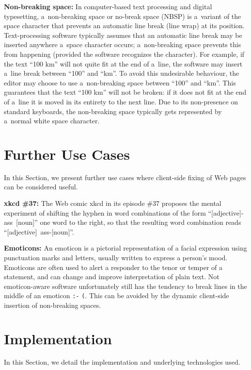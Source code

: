 \documentclass{acm_proc_article-sp}
\begin{document}
\textbf{Non-breaking space:} In computer-based text processing and digital typesetting,
a~non-breaking space or no-break space (NBSP) is a~variant of the space character that prevents an automatic line break (line wrap) at its position.
Text-processing software typically assumes that an automatic line break may be inserted anywhere a~space
character occurs;
a~non-breaking space prevents this from happening (provided the software recognizes the character).
For example, if the text ``100 km'' will not quite fit at the end of a~line,
the software may insert a~line break between ``100'' and ``km''.
To avoid this undesirable behaviour, the editor may choose to use a~non-breaking space between ``100'' and ``km''.
This guarantees that the text ``100 km'' will not be broken:
if it does not fit at the end of a~line
it is moved in its entirety to the next line.
Due to its non-presence on standard keyboards,
the non-breaking space typically gets represented by a~normal white space character.

\section{Further Use Cases}
In this Section, we present further use cases where client-side fixing of Web pages can be considered useful.

\textbf{xkcd \#37:} The Web comic xkcd in its episode \#37 proposes the mental experiment of shifting the hyphen in word combinations of the form \mbox{``[adjective]-ass [noun]''} one word to the right,
so that the resulting word combination reads \mbox{``[adjective] ass-[noun]''}.

\textbf{Emoticons:} An emoticon is a pictorial representation of a facial expression using punctuation marks and letters,
usually written to express a person's mood.
Emoticons are often used to alert a responder to the tenor or temper of a statement,
and can change and improve interpretation of plain text.
Not emoticon-aware software unfortunately still has the tendency to break lines in the middle of an emoticon \texttt{:-} \linebreak %
\texttt{(}. This can be avoided by the dynamic client-side insertion of non-breaking spaces.

\section{Implementation}
In this Section, we detail the implementation and underlying technologies used.
\end{document}
